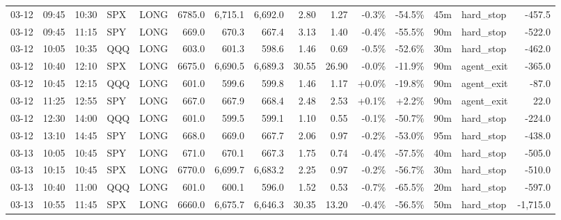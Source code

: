 \documentclass[11pt,a4paper,twoside]{article}
\begin{document}
\begin{landscape}
\begin{center}
\begin{longtable}{>{\color{txtmain}}l l l l l r r r r r r r r >{\color{txtmain}}l r}
03-12 & 09:45 & 10:30 & SPX & LONG & 6785.0 & 6,715.1 & 6,692.0 & 2.80 & 1.27 & \textcolor{lossred}{-0.3\%} & \textcolor{lossred}{-54.5\%} & 45m & hard\_stop & \textcolor{lossred}{-457.5} \\
03-12 & 09:45 & 11:15 & SPY & LONG & 669.0 & 670.3 & 667.4 & 3.13 & 1.40 & \textcolor{lossred}{-0.4\%} & \textcolor{lossred}{-55.5\%} & 90m & hard\_stop & \textcolor{lossred}{-522.0} \\
03-12 & 10:05 & 10:35 & QQQ & LONG & 603.0 & 601.3 & 598.6 & 1.46 & 0.69 & \textcolor{lossred}{-0.5\%} & \textcolor{lossred}{-52.6\%} & 30m & hard\_stop & \textcolor{lossred}{-462.0} \\
03-12 & 10:40 & 12:10 & SPX & LONG & 6675.0 & 6,690.5 & 6,689.3 & 30.55 & 26.90 & \textcolor{lossred}{-0.0\%} & \textcolor{lossred}{-11.9\%} & 90m & agent\_exit & \textcolor{lossred}{-365.0} \\
03-12 & 10:45 & 12:15 & QQQ & LONG & 601.0 & 599.6 & 599.8 & 1.46 & 1.17 & \textcolor{wingreen}{+0.0\%} & \textcolor{lossred}{-19.8\%} & 90m & agent\_exit & \textcolor{lossred}{-87.0} \\
03-12 & 11:25 & 12:55 & SPY & LONG & 667.0 & 667.9 & 668.4 & 2.48 & 2.53 & \textcolor{wingreen}{+0.1\%} & \textcolor{wingreen}{+2.2\%} & 90m & agent\_exit & \textcolor{wingreen}{22.0} \\
03-12 & 12:30 & 14:00 & QQQ & LONG & 601.0 & 599.5 & 599.1 & 1.10 & 0.55 & \textcolor{lossred}{-0.1\%} & \textcolor{lossred}{-50.7\%} & 90m & hard\_stop & \textcolor{lossred}{-224.0} \\
03-12 & 13:10 & 14:45 & SPY & LONG & 668.0 & 669.0 & 667.7 & 2.06 & 0.97 & \textcolor{lossred}{-0.2\%} & \textcolor{lossred}{-53.0\%} & 95m & hard\_stop & \textcolor{lossred}{-438.0} \\
03-13 & 10:05 & 10:45 & SPY & LONG & 671.0 & 670.1 & 667.3 & 1.75 & 0.74 & \textcolor{lossred}{-0.4\%} & \textcolor{lossred}{-57.5\%} & 40m & hard\_stop & \textcolor{lossred}{-505.0} \\
03-13 & 10:15 & 10:45 & SPX & LONG & 6770.0 & 6,699.7 & 6,683.2 & 2.25 & 0.97 & \textcolor{lossred}{-0.2\%} & \textcolor{lossred}{-56.7\%} & 30m & hard\_stop & \textcolor{lossred}{-510.0} \\
03-13 & 10:40 & 11:00 & QQQ & LONG & 601.0 & 600.1 & 596.0 & 1.52 & 0.53 & \textcolor{lossred}{-0.7\%} & \textcolor{lossred}{-65.5\%} & 20m & hard\_stop & \textcolor{lossred}{-597.0} \\
03-13 & 10:55 & 11:45 & SPX & LONG & 6660.0 & 6,675.7 & 6,646.3 & 30.35 & 13.20 & \textcolor{lossred}{-0.4\%} & \textcolor{lossred}{-56.5\%} & 50m & hard\_stop & \textcolor{lossred}{-1,715.0} \\

\end{longtable}
\end{center}
\end{landscape}
\end{document}

